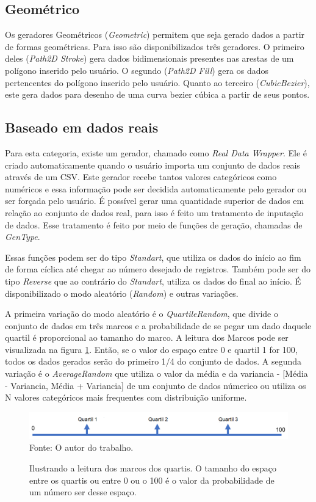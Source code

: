 \documentclass[
	12pt,				%
	openright,			%
	oneside,			%
	a4paper,			%
	english,			%
	brazil				%
	]{abntex2}
\begin{document}
		\subsection{Geométrico}
			Os geradores Geométricos (\emph{Geometric}) permitem que seja gerado dados a partir de formas geométricas.
			Para isso são disponibilizados três geradores.
			O primeiro deles (\emph{Path2D Stroke}) gera dados bidimensionais presentes nas arestas de um polígono inserido pelo usuário.
			O segundo (\emph{Path2D Fill}) gera os dados pertencentes do polígono inserido pelo usuário.
			Quanto ao terceiro (\emph{CubicBezier}), este gera dados para desenho de uma curva bezier cúbica a partir de seus pontos.
		\subsection{Baseado em dados reais}
			Para esta categoria, existe um gerador, chamado como \emph{Real Data Wrapper}.
			Ele é criado automaticamente quando o usuário importa um conjunto de dados reais através de um CSV.
			Este gerador recebe tantos valores categóricos como numéricos e essa informação pode ser decidida automaticamente pelo gerador ou ser forçada pelo usuário.
			É possível gerar uma quantidade superior de dados em relação ao conjunto de dados real, para isso é feito um tratamento de inputação de dados.
			Esse tratamento é feito por meio de funções de geração, chamadas de \emph{GenType}.
			\par
			Essas funções podem ser do tipo \emph{Standart}, que utiliza os dados do início ao fim de forma cíclica até chegar ao número desejado de registros.
			Também pode ser do tipo \emph{Reverse} que ao contrário do \emph{Standart}, utiliza os dados do final ao início.
			É disponibilizado o modo aleatório (\emph{Random}) e outras variações.
			\par
			A primeira variação do modo aleatório é o \emph{QuartileRandom}, que divide o conjunto de dados em três marcos e a probabilidade de se pegar um dado daquele quartil é proporcional ao tamanho do marco.
			A leitura dos Marcos pode ser visualizada na figura \ref{fig:leituraMarco}. Então, se o valor do espaço entre 0 e quartil 1 for 100, todos os dados gerados serão do primeiro 1/4 do conjunto de dados.
			A segunda variação é o \emph{AverageRandom} que utiliza o valor da média e da variancia - [Média - Variancia, Média + Variancia] de um conjunto de dados númerico ou utiliza os N valores categóricos mais frequentes com distribuição uniforme.
			\begin{figure}[h]
				\centering
				\caption{Ilustrando a leitura dos marcos dos quartis. O tamanho do espaço entre os quartis ou entre 0 ou o 100 é o valor da probabilidade de um número ser desse espaço.}
				\includegraphics[width=\linewidth]{./figures/prototipo/quartil.png}
				\label{fig:leituraMarco}
				\footnotesize Fonte: O autor do trabalho.
			\end{figure}
\end{document}
